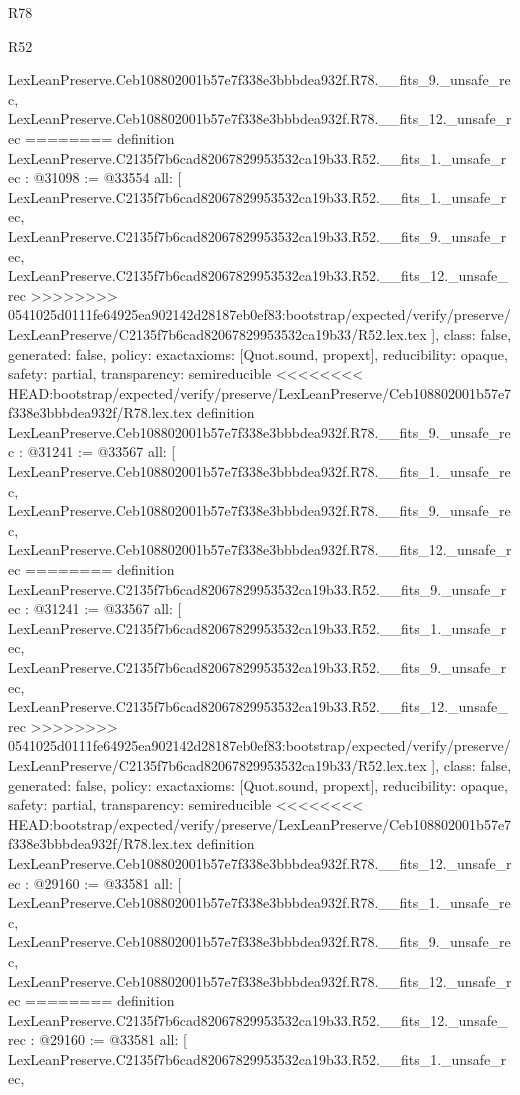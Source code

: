 \begin{lexlean}{R78}
\begin{lexlean}{R52}
\begin{coremodule}
{{{{{{{{{{{{{{{{{{{{{{{{{{{{{{{{{{{{{{{{{{{{{{{{{{{{{{{{{{{{{{{{{{{{{{{{{{{{{{{{{{{{{{{{{{{{{{{{{{{{{{{{{{{{{{{{{{{{{{{{{{{{{{{{{{{{{{{{{{{{{{{{{{{{{{{{{{{    LexLeanPreserve.Ceb108802001b57e7f338e3bbbdea932f.R78.__fits_9._unsafe_rec,
    LexLeanPreserve.Ceb108802001b57e7f338e3bbbdea932f.R78.__fits_12._unsafe_rec
========
definition LexLeanPreserve.C2135f7b6cad82067829953532ca19b33.R52.__fits_1._unsafe_rec : @31098 := @33554 {
  all: [
    LexLeanPreserve.C2135f7b6cad82067829953532ca19b33.R52.__fits_1._unsafe_rec,
    LexLeanPreserve.C2135f7b6cad82067829953532ca19b33.R52.__fits_9._unsafe_rec,
    LexLeanPreserve.C2135f7b6cad82067829953532ca19b33.R52.__fits_12._unsafe_rec
>>>>>>>> 0541025d0111fe64925ea902142d28187eb0ef83:bootstrap/expected/verify/preserve/LexLeanPreserve/C2135f7b6cad82067829953532ca19b33/R52.lex.tex
  ],
  class: false,
  generated: false,
  policy: exact{axioms: [Quot.sound, propext]},
  reducibility: opaque{},
  safety: partial,
  transparency: semireducible
}
<<<<<<<< HEAD:bootstrap/expected/verify/preserve/LexLeanPreserve/Ceb108802001b57e7f338e3bbbdea932f/R78.lex.tex
definition LexLeanPreserve.Ceb108802001b57e7f338e3bbbdea932f.R78.__fits_9._unsafe_rec : @31241 := @33567 {
  all: [
    LexLeanPreserve.Ceb108802001b57e7f338e3bbbdea932f.R78.__fits_1._unsafe_rec,
    LexLeanPreserve.Ceb108802001b57e7f338e3bbbdea932f.R78.__fits_9._unsafe_rec,
    LexLeanPreserve.Ceb108802001b57e7f338e3bbbdea932f.R78.__fits_12._unsafe_rec
========
definition LexLeanPreserve.C2135f7b6cad82067829953532ca19b33.R52.__fits_9._unsafe_rec : @31241 := @33567 {
  all: [
    LexLeanPreserve.C2135f7b6cad82067829953532ca19b33.R52.__fits_1._unsafe_rec,
    LexLeanPreserve.C2135f7b6cad82067829953532ca19b33.R52.__fits_9._unsafe_rec,
    LexLeanPreserve.C2135f7b6cad82067829953532ca19b33.R52.__fits_12._unsafe_rec
>>>>>>>> 0541025d0111fe64925ea902142d28187eb0ef83:bootstrap/expected/verify/preserve/LexLeanPreserve/C2135f7b6cad82067829953532ca19b33/R52.lex.tex
  ],
  class: false,
  generated: false,
  policy: exact{axioms: [Quot.sound, propext]},
  reducibility: opaque{},
  safety: partial,
  transparency: semireducible
}
<<<<<<<< HEAD:bootstrap/expected/verify/preserve/LexLeanPreserve/Ceb108802001b57e7f338e3bbbdea932f/R78.lex.tex
definition LexLeanPreserve.Ceb108802001b57e7f338e3bbbdea932f.R78.__fits_12._unsafe_rec : @29160 := @33581 {
  all: [
    LexLeanPreserve.Ceb108802001b57e7f338e3bbbdea932f.R78.__fits_1._unsafe_rec,
    LexLeanPreserve.Ceb108802001b57e7f338e3bbbdea932f.R78.__fits_9._unsafe_rec,
    LexLeanPreserve.Ceb108802001b57e7f338e3bbbdea932f.R78.__fits_12._unsafe_rec
========
definition LexLeanPreserve.C2135f7b6cad82067829953532ca19b33.R52.__fits_12._unsafe_rec : @29160 := @33581 {
  all: [
    LexLeanPreserve.C2135f7b6cad82067829953532ca19b33.R52.__fits_1._unsafe_rec,
}}}}}}}}}}}}}}}}}}}}}}}}}}}}}}}}}}}}}}}}}}}}}}}}}}}}}}}}}}}}}}}}}}}}}}}}}}}}}}}}}}}}}}}}}}}}}}}}}}}}}}}}}}}}}}}}}}}}}}}}}}}}}}}}}}}}}}}}}}}}}}}}}}}}}}}}}}}}}}
\end{coremodule}
\end{lexlean}
\end{lexlean}
